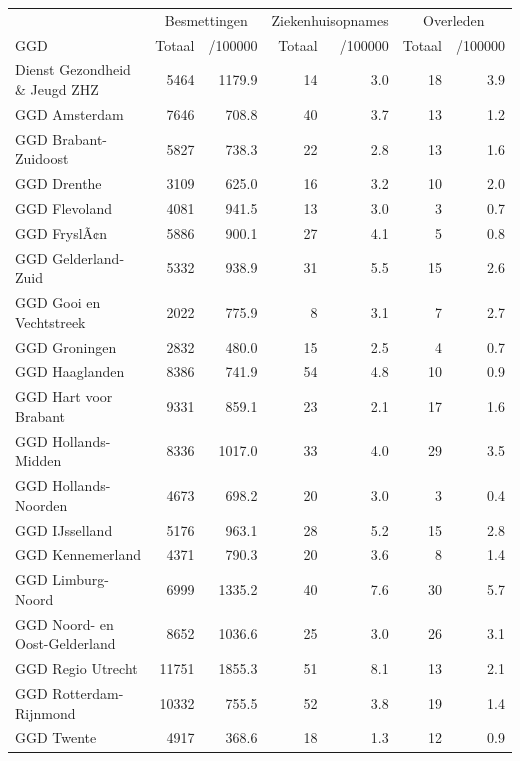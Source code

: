 \documentclass[
  english,
  man,floatsintext]{apa6}
\begin{document}
\begin{table}
\centering\begingroup\fontsize{10}{12}\selectfont

\begin{threeparttable}
\begin{tabular}{lrrrrrr}
\toprule
\multicolumn{1}{c}{ } & \multicolumn{2}{c}{Besmettingen} & \multicolumn{2}{c}{Ziekenhuisopnames} & \multicolumn{2}{c}{Overleden} \\
\cmidrule(l{3pt}r{3pt}){2-3} \cmidrule(l{3pt}r{3pt}){4-5} \cmidrule(l{3pt}r{3pt}){6-7}
GGD & Totaal & /100000 & Totaal & /100000 & Totaal & /100000\\
\midrule
Dienst Gezondheid \& Jeugd ZHZ & 5464 & 1179.9 & 14 & 3.0 & 18 & 3.9\\
GGD Amsterdam & 7646 & 708.8 & 40 & 3.7 & 13 & 1.2\\
GGD Brabant-Zuidoost & 5827 & 738.3 & 22 & 2.8 & 13 & 1.6\\
GGD Drenthe & 3109 & 625.0 & 16 & 3.2 & 10 & 2.0\\
GGD Flevoland & 4081 & 941.5 & 13 & 3.0 & 3 & 0.7\\
GGD FryslÃ¢n & 5886 & 900.1 & 27 & 4.1 & 5 & 0.8\\
GGD Gelderland-Zuid & 5332 & 938.9 & 31 & 5.5 & 15 & 2.6\\
GGD Gooi en Vechtstreek & 2022 & 775.9 & 8 & 3.1 & 7 & 2.7\\
GGD Groningen & 2832 & 480.0 & 15 & 2.5 & 4 & 0.7\\
GGD Haaglanden & 8386 & 741.9 & 54 & 4.8 & 10 & 0.9\\
GGD Hart voor Brabant & 9331 & 859.1 & 23 & 2.1 & 17 & 1.6\\
GGD Hollands-Midden & 8336 & 1017.0 & 33 & 4.0 & 29 & 3.5\\
GGD Hollands-Noorden & 4673 & 698.2 & 20 & 3.0 & 3 & 0.4\\
GGD IJsselland & 5176 & 963.1 & 28 & 5.2 & 15 & 2.8\\
GGD Kennemerland & 4371 & 790.3 & 20 & 3.6 & 8 & 1.4\\
GGD Limburg-Noord & 6999 & 1335.2 & 40 & 7.6 & 30 & 5.7\\
GGD Noord- en Oost-Gelderland & 8652 & 1036.6 & 25 & 3.0 & 26 & 3.1\\
GGD Regio Utrecht & 11751 & 1855.3 & 51 & 8.1 & 13 & 2.1\\
GGD Rotterdam-Rijnmond & 10332 & 755.5 & 52 & 3.8 & 19 & 1.4\\
GGD Twente & 4917 & 368.6 & 18 & 1.3 & 12 & 0.9\\

\end{tabular}
\end{threeparttable}
\end{table}
\end{document}
